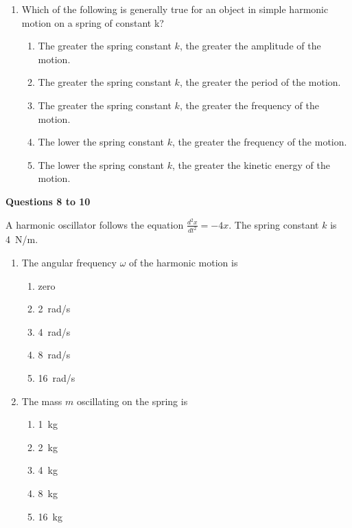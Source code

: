 \documentclass{../../oss-apphys}
\begin{document}
\begin{multicols}{2}
\begin{enumerate}[leftmargin=18pt]
    \columnbreak
    
  \item Which of the following is generally true for an object in simple
    harmonic motion on a spring of constant k?
    \begin{enumerate}[noitemsep,topsep=0pt]
    \item The greater the spring constant $k$, the greater the amplitude of the
      motion.
    \item The greater the spring constant $k$, the greater the period of the
      motion.
    \item The greater the spring constant $k$, the greater the frequency of the
      motion.
    \item The lower the spring constant $k$, the greater the frequency of the
      motion.
    \item The lower the spring constant $k$, the greater the kinetic energy of
      the motion.
    \end{enumerate}
  \end{enumerate}

  \textbf{Questions 8 to 10}

  A harmonic oscillator follows the equation
  $\displaystyle\frac{d^2x}{dt^2}=-4x$. The spring constant $k$ is \SI{4}{N/m}.
  
  \begin{enumerate}[leftmargin=18pt,start=8]
  \item The angular frequency $\omega$ of the harmonic motion is
    \begin{enumerate}[noitemsep,topsep=0pt]
    \item zero
    \item\SI{2}{rad/s}
    \item\SI{4}{rad/s}
    \item\SI{8}{rad/s}
    \item\SI{16}{rad/s}
    \end{enumerate}

  \item The mass $m$ oscillating on the spring is
    \begin{enumerate}[noitemsep,topsep=0pt]
    \item\SI{1}{\kg}
    \item\SI{2}{\kg}
    \item\SI{4}{\kg}
    \item\SI{8}{\kg}
    \item\SI{16}{\kg}
    \end{enumerate}
  

\end{enumerate}
\end{multicols}
\end{document}
